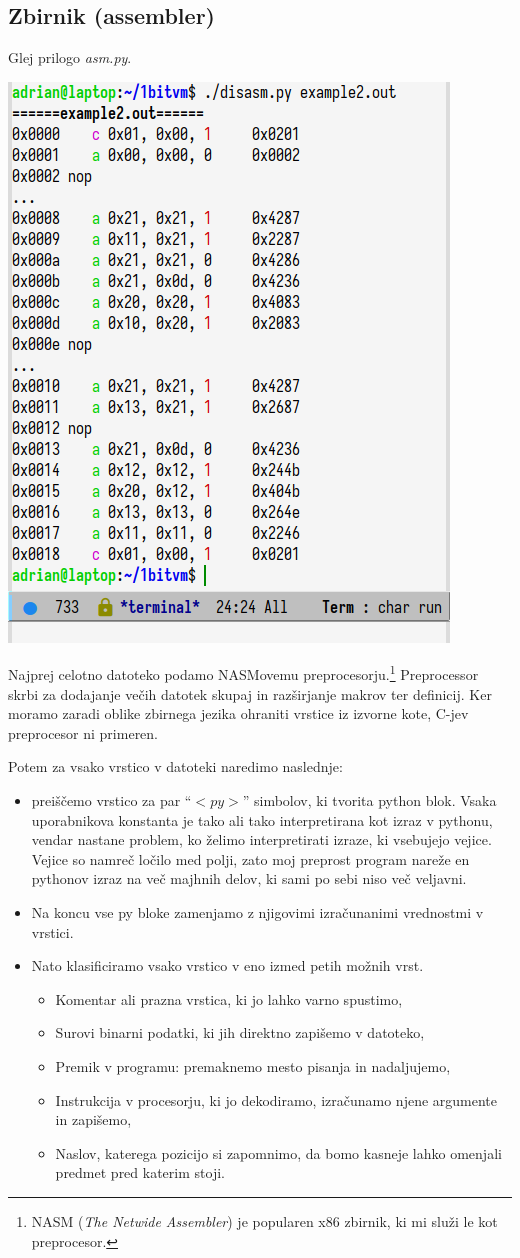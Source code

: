 \documentclass[12pt]{article}
\begin{document}
\subsection{Zbirnik (assembler)}
Glej prilogo \textit{asm.py}.

\begin{center}
  \includegraphics[width=.4\linewidth]{slike/razbirnik.png}
\end{center}

Najprej celotno datoteko podamo NASMovemu preprocesorju.\footnote{NASM (\textit{The Netwide Assembler}) je popularen x86 zbirnik, ki mi služi le kot preprocesor.}
Preprocessor skrbi za dodajanje večih datotek skupaj in razširjanje makrov ter definicij.
Ker moramo zaradi oblike zbirnega jezika ohraniti vrstice iz izvorne kote, C-jev preprocesor ni primeren.

Potem za vsako vrstico v datoteki naredimo naslednje:
\begin{itemize}
  \item preiščemo vrstico za par ``$<py>$'' simbolov, ki tvorita python blok.
  Vsaka uporabnikova konstanta je tako ali tako interpretirana kot izraz v pythonu, vendar nastane problem, ko želimo interpretirati izraze, ki vsebujejo vejice.
  Vejice so namreč ločilo med polji, zato moj preprost program nareže en pythonov izraz na več majhnih delov, ki sami po sebi niso več veljavni.
  \item Na koncu vse py bloke zamenjamo z njigovimi izračunanimi vrednostmi v vrstici.
  \item Nato klasificiramo vsako vrstico v eno izmed petih možnih vrst.
  \begin{itemize}
    \item Komentar ali prazna vrstica, ki jo lahko varno spustimo,
    \item Surovi binarni podatki, ki jih direktno zapišemo v datoteko,
    \item Premik v programu: premaknemo mesto pisanja in nadaljujemo,
    \item Instrukcija v procesorju, ki jo dekodiramo, izračunamo njene argumente in zapišemo,
    \item Naslov, katerega pozicijo si zapomnimo, da bomo kasneje lahko omenjali predmet pred katerim stoji.
  \end{itemize}
\end{itemize}
\end{document}
